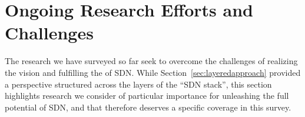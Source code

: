 \section{Ongoing Research Efforts and Challenges}
\label{sec:challenges}


The research  we have surveyed so far seek to overcome the challenges of realizing the vision and fulfilling the  of SDN.
While Section~\ref{sec:layeredapproach} provided a perspective structured across the layers of the ``SDN stack'', this
section highlights research  we consider of particular importance for unleashing the full potential of SDN, and that therefore deserves a specific coverage in this survey.

